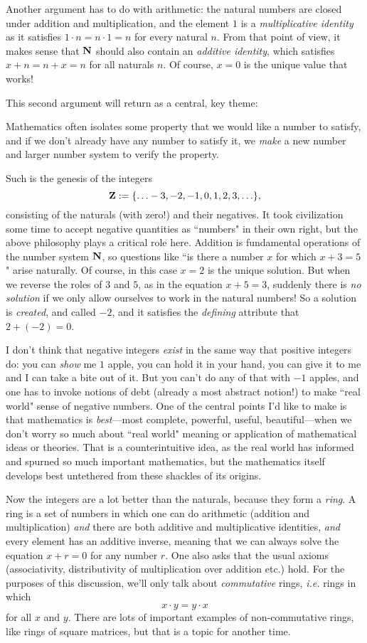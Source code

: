 \documentclass[11pt,oneside]{amsart}
\begin{document}
Another argument has to do with arithmetic: the natural numbers are closed under addition and multiplication, and the element $1$ is a {\em multiplicative identity} as it satisfies $1\cdot n=n\cdot 1=n$ for every natural $n$.  From that point of view, it makes sense that $\mathbf{N}$ should also contain an {\em additive identity}, which satisfies $x + n = n + x = n$ for all naturals $n$.  Of course, $x=0$ is the unique value that works!

This second argument will return as a central, key theme: 
\begin{philosophy}
	Mathematics often isolates some property that we would like a number to satisfy, and if we don't already have any number to satisfy it, we {\em make} a new number and larger number system to verify the property. 
\end{philosophy}

Such is the genesis of the integers
$$\mathbf{Z}:=\{\ldots -3,-2,-1,0,1,2,3,\ldots\},$$
consisting of the naturals (with zero!) and their negatives.  It took civilization some time to accept negative quantities as ``numbers" in their own right,
but the above philosophy plays a critical role here.  Addition is fundamental operations of the number system $\mathbf{N}$,
so questions like ``is there a number $x$ for which $x+3=5$" arise naturally.  Of course, in this case $x=2$ is the unique solution.
But when we reverse the roles of $3$ and $5$, as in the equation $x+5=3$, suddenly there is {\em no solution} if we only allow ourselves to 
work in the natural numbers!  So a solution is {\em created}, and called $-2$, and it satisfies the {\em defining} attribute that $2 + (-2) = 0$.

I don't think that negative integers {\em exist} in the same way that positive integers do: you can {\em show} me $1$ apple, you can hold it in your hand,
you can give it to me and I can take a bite out of it.  But you can't do any of that with $-1$ apples, and one has to invoke notions of debt (already a most abstract notion!) to make ``real world" sense of negative numbers. One of the central points I'd like to make is that mathematics is {\em best}---most complete, powerful, useful, beautiful---when we don't worry so much about ``real world" meaning or application of mathematical ideas or theories.  That is a counterintuitive idea, 
as the real world has informed and spurned so much important mathematics, but the mathematics itself develops best untethered from these shackles of its origins.

Now the integers are a lot better than the naturals, because they form a {\em ring}.  A ring is a set of numbers in which one can do arithmetic
(addition and multiplication) {\em and} there are both additive and multiplicative identities, {\em and} every element has an additive inverse,
meaning that we can always solve the equation $x+r = 0$ for any number $r$.  One also asks that the usual axioms (associativity, distributivity of
multiplication over addition etc.) hold.  For the purposes of this discussion, we'll only talk about {\em commutative} rings, {\em i.e.} rings in which
$$x\cdot y = y\cdot x$$
for all $x$ and $y$.  There are lots of important examples of non-commutative rings, like rings of square matrices, but that is a topic for another time.
\end{document}
